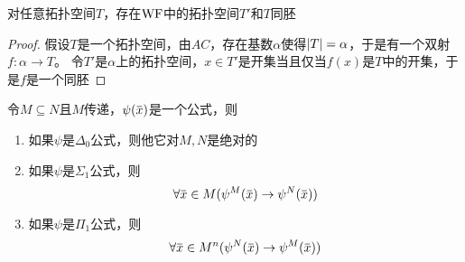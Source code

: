\documentclass[11pt]{article}
\begin{document}
\begin{exercise}[7.10.5]
对任意拓扑空间\(T\)，存在\(\operatorname{WF}\)中的拓扑空间\(T'\)和\(T\)同胚
\end{exercise}

\begin{proof}
假设\(T\)是一个拓扑空间，由\(AC\)，存在基数\(\alpha\)使得\(\abs{T}=\alpha\)，于是有一个双射\(f:\alpha\to T\)。
令\(T'\)是\(\alpha\)上的拓扑空间，\(x\in T'\)是开集当且仅当\(f(x)\)是\(T\)中的开集，于是\(f\)是一个同胚
\end{proof}

\begin{exercise}[7.10.6]
令\(M\subseteq N\)且\(M\)传递，\(\psi(\barx)\)是一个公式，则
\begin{enumerate}
\item 如果\(\psi\)是\(\Delta_0\)公式，则他它对\(M,N\)是绝对的
\item 如果\(\psi\)是\(\Sigma_1\)公式，则
\begin{equation*}
\forall\barx\in M(\psi^M(\barx)\to\psi^N(\barx))
\end{equation*}
\item 如果\(\psi\)是\(\Pi_1\)公式，则
\begin{equation*}
\forall\barx\in M^n(\psi^N(\barx)\to\psi^M(\barx))
\end{equation*}
\end{enumerate}
\end{exercise}
\end{document}
